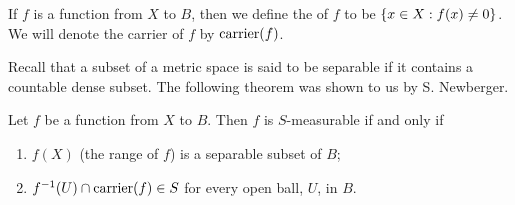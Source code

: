 \begin{definition}
If $f$ is a function from $X$ to $B$, then we define the  of $f$ to be $\left\{x\in X: f(x)\neq 0\right\}$. We will denote the carrier of $f$ by $\operatorname{carrier}(f)$. 
\end{definition}

Recall that a subset of a metric space is said to be separable if it contains a countable dense subset. The following theorem was shown to us by S. Newberger.

\begin{theorem}\label{thm:characterization of meas func}
Let $f$ be a function from $X$ to $B$. Then $f$ is $S$-measurable if and only if
\begin{enumerate}[label=\arabic*),ref=\arabic*)]
    \item\label{thm:item:sep range} $f(X)$ (the range of $f$) is a separable subset of $B$;
    \item\label{thm:item:car} $f^{-1}(U)\cap\operatorname{carrier}(f)\in S$ for every open ball, $U$, in $B$.
\end{enumerate}
\end{theorem}

